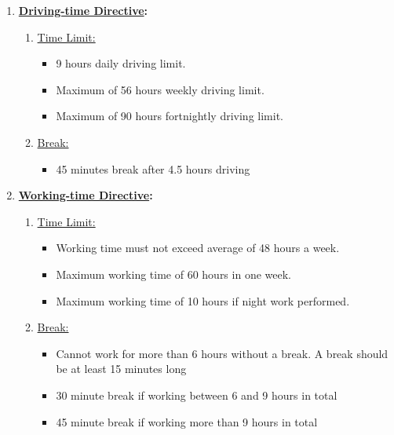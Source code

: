\begin{enumerate}[label=\textbf{(\arabic*)}]
    \item \textbf{\underline{Driving-time Directive}: }
       
       \vspace{\baselineskip}
        \noindent
        \begin{enumerate}[label=\roman*]
       \item \underline{Time Limit:}
       
        \begin{itemize}
            \item 9 hours daily driving limit.
            \item Maximum of 56 hours weekly driving limit.      
            \item Maximum of 90 hours fortnightly driving limit.
        \end{itemize} 
        
        \vspace{\baselineskip}
        \noindent
      \item  \underline{Break:}
        \begin{itemize}
        \item 45 minutes break after 4.5 hours driving
        \end{itemize} 
        \end{enumerate}

    \item \textbf{\underline{Working-time Directive}: }
    
      \vspace{\baselineskip}
      \noindent
      \begin{enumerate}[label=\roman*]
    \item  \underline{Time Limit:}
    
        \begin{itemize}
            \item Working time must not exceed average of 48 hours a week.
            \item Maximum working time of 60 hours in one week.
            \item Maximum working time of 10 hours if night work performed.
        \end{itemize}  
        
        
        \vspace{\baselineskip}
        \noindent
    \item    \underline{Break:}
        \begin{itemize}
        \item Cannot work for more than 6 hours without a break. A break should be at least 15 minutes long
        \item 30 minute break if working between 6 and 9 hours in total
        \item 45 minute break if working more than 9 hours in total
        \end{itemize} 
        \end{enumerate}

\end{enumerate}

